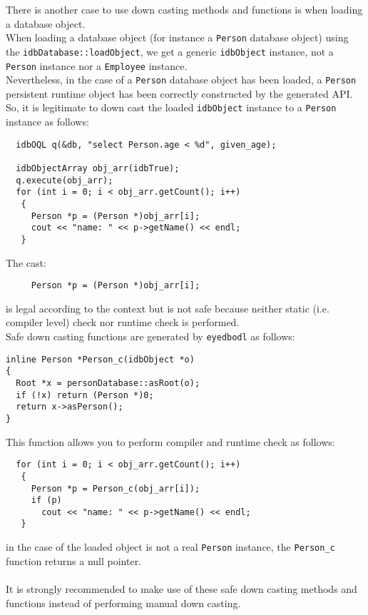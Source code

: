 There is another case to use down casting methods and functions is when
loading a database object.
\\
When loading a database object (for instance a \texttt{Person} database object)
using the \texttt{idbDatabase::loadObject}, we get a generic \texttt{idbObject}
instance, not a \texttt{Person} instance nor a \texttt{Employee} instance.
\\
Nevertheless, in the case of a \texttt{Person} database object has been
loaded, a \texttt{Person} persistent runtime object has been correctly
constructed by the generated API.
\\
So, it is legitimate to down cast the loaded \texttt{idbObject} instance
to a \texttt{Person} instance as follows:
\verbsize
\begin{verbatim}
  idbOQL q(&db, "select Person.age < %

  idbObjectArray obj_arr(idbTrue);
  q.execute(obj_arr);
  for (int i = 0; i < obj_arr.getCount(); i++)
   {
     Person *p = (Person *)obj_arr[i];
     cout << "name: " << p->getName() << endl;
   }
\end{verbatim}
\normalsize
The cast:
\verbsize
\begin{verbatim}
     Person *p = (Person *)obj_arr[i];
\end{verbatim}
\normalsize
is legal according to the context but is not safe because neither static
(i.e. compiler level) check nor runtime check is performed.
\\
Safe down casting functions are generated by \texttt{eyedbodl} as follows:
\verbsize
\begin{verbatim}
inline Person *Person_c(idbObject *o)
{
  Root *x = personDatabase::asRoot(o);
  if (!x) return (Person *)0;
  return x->asPerson();
}
\end{verbatim}
\normalsize
This function allows you to perform compiler and runtime check as follows:
\verbsize
\begin{verbatim}
  for (int i = 0; i < obj_arr.getCount(); i++)
   {
     Person *p = Person_c(obj_arr[i]);
     if (p) 
       cout << "name: " << p->getName() << endl;
   }
\end{verbatim}
\normalsize
in the case of the loaded object is not a real \texttt{Person} instance,
the \texttt{Person\_c} function returns a null pointer.
\\
\\
It is strongly recommended to make use of these safe down casting methods
and functions instead of performing manual down casting.
